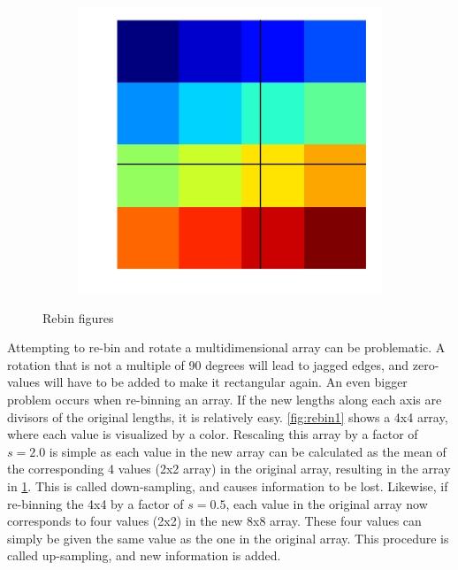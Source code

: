 \begin{figure}
\begin{subfigure}{0.32\textwidth}
		\caption{}
		\label{fig:rebin3}
	\end{subfigure}
	\hfill
		\begin{subfigure}{0.32\textwidth}
		\includegraphics[width=\textwidth]{fig/other/rebin2}
		\caption{}
		\label{fig:rebin2}
	\end{subfigure}
\caption{
\label{fig:rebin}%
Rebin figures}
\end{figure}

Attempting to re-bin and rotate a multidimensional array can be problematic. A rotation that is not a multiple of 90 degrees will lead to jagged edges, and zero-values will have to be added to make it rectangular again. An even bigger problem occurs when re-binning an array. If the new lengths along each axis are divisors of the original lengths, it is relatively easy. \cref{fig:rebin1} shows a 4x4 array, where each value is visualized by a color. Rescaling this array by a factor of $s=2.0$ is simple as each value in the new array can be calculated as the mean of the corresponding 4 values (2x2 array) in the original array, resulting in the array in \cref{fig:rebin3}. This is called down-sampling, and causes information to be lost. Likewise, if re-binning the 4x4 by a factor of $s=0.5$, each value in the original array now corresponds to four values (2x2) in the new 8x8 array. These four values can simply be given the same value as the one in the original array. This procedure is called up-sampling, and new information is added.

